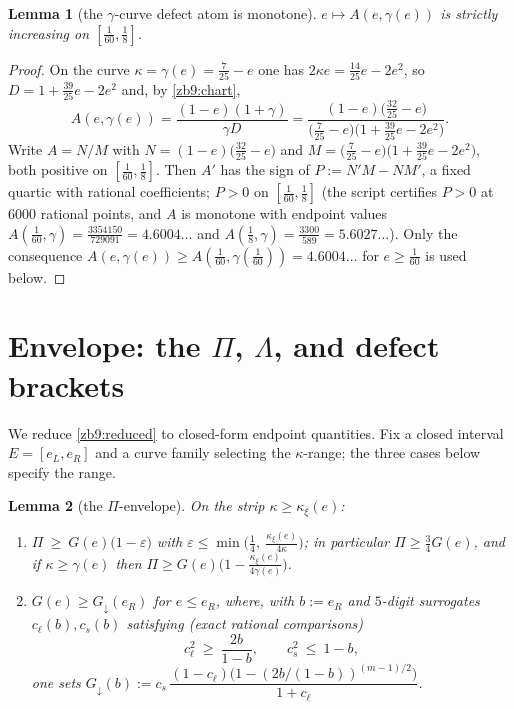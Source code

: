 \documentclass[11pt]{article}
\newtheorem{lemma}{Lemma}[section]
\theoremstyle{remark}
\newcommand{\eps}{\varepsilon}
\newcommand{\kxi}{\kappa_\xi}
\begin{document}
\begin{lemma}[the $\gamma$-curve defect atom is monotone]\label{zb9:Agamma}
$e\mapsto A(e,\gamma(e))$ is strictly increasing on $[\tfrac1{60},\tfrac18]$.
\end{lemma}

\begin{proof}
On the curve $\kappa=\gamma(e)=\tfrac7{25}-e$ one has
$2\kappa e=\tfrac{14}{25}e-2e^2$, so $D=1+\tfrac{39}{25}e-2e^2$ and, by
\eqref{zb9:chart},
\[
        A(e,\gamma(e))=\frac{(1-e)(1+\gamma)}{\gamma D}
        =\frac{(1-e)\bigl(\tfrac{32}{25}-e\bigr)}
              {\bigl(\tfrac7{25}-e\bigr)\bigl(1+\tfrac{39}{25}e-2e^2\bigr)} .
\]
Write $A=N/M$ with $N=(1-e)\bigl(\tfrac{32}{25}-e\bigr)$ and
$M=\bigl(\tfrac7{25}-e\bigr)\bigl(1+\tfrac{39}{25}e-2e^2\bigr)$, both positive
on $[\tfrac1{60},\tfrac18]$.  Then $A'$ has the sign of
$P:=N'M-NM'$, a fixed quartic with rational coefficients; $P>0$ on
$[\tfrac1{60},\tfrac18]$ (the script certifies $P>0$ at $6000$ rational
points, and $A$ is monotone with endpoint values
$A(\tfrac1{60},\gamma)=\tfrac{3354150}{729091}=4.6004\ldots$ and
$A(\tfrac18,\gamma)=\tfrac{3300}{589}=5.6027\ldots$).  Only the consequence
$A(e,\gamma(e))\ge A(\tfrac1{60},\gamma(\tfrac1{60}))=4.6004\ldots$ for
$e\ge\tfrac1{60}$ is used below.
\end{proof}

\section{Envelope: the $\Pi$, $\Lambda$, and defect brackets}\label{zb9:sec:env}

We reduce \eqref{zb9:reduced} to closed-form endpoint quantities.  Fix a
closed interval $E=[e_L,e_R]$ and a curve family selecting the $\kappa$-range;
the three cases below specify the range.

\begin{lemma}[the $\Pi$-envelope]\label{zb9:env}
On the strip $\kappa\ge\kxi(e)$:
\begin{enumerate}[label=\textup{(\alph*)},itemsep=1pt]
\item $\Pi\ \ge\ G(e)\bigl(1-\eps\bigr)$ with
$\eps\le\min\bigl(\tfrac14,\ \tfrac{\kxi(e)}{4\kappa}\bigr)$; in particular
$\Pi\ge\tfrac34 G(e)$, and if $\kappa\ge\gamma(e)$ then
$\Pi\ge G(e)\bigl(1-\tfrac{\kxi(e)}{4\gamma(e)}\bigr)$.
\item $G(e)\ge G_\downarrow(e_R)$ for $e\le e_R$, where, with $b:=e_R$ and
$5$-digit surrogates $c_\ell(b),c_s(b)$ satisfying (exact rational
comparisons)
\begin{equation}\label{zb9:surr}
        c_\ell^2\ \ge\ \frac{2b}{1-b},\qquad c_s^2\ \le\ 1-b,
\end{equation}
one sets $G_\downarrow(b):=c_s\,\dfrac{(1-c_\ell)\bigl(1-(2b/(1-b))^{(m-1)/2}\bigr)}
{1+c_\ell}$.
\end{enumerate}
\end{lemma}
\end{document}
